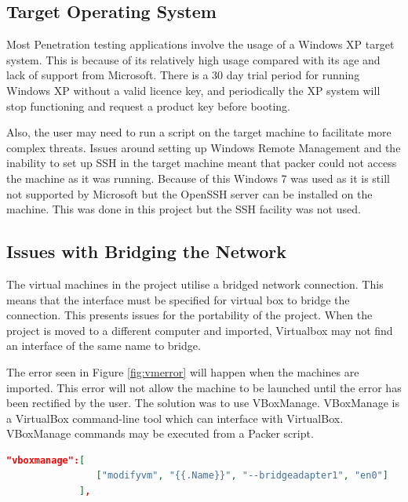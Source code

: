 \subsection{Target Operating System}
Most Penetration testing applications involve the usage of a Windows XP target system. This is because of its relatively high usage compared with its age and lack of support from Microsoft. There is a 30 day trial period for running Windows XP without a valid licence key, and periodically the XP system will stop functioning and request a product key before booting. 

Also, the user may need to run a script on the target machine to facilitate more complex threats. Issues around setting up Windows Remote Management and the inability to set up SSH in the target machine meant that packer could not access the machine as it was running. Because of this Windows 7 was used as it is still not supported by Microsoft but the OpenSSH server can be installed on the machine. This was done in this project but the SSH facility was not used.

\subsection{Issues with Bridging the Network}
The virtual machines in the project utilise a bridged network connection. This means that the interface must be specified for virtual box to bridge the connection. This presents issues for the portability of the project. When the project is moved to a different computer and imported, Virtualbox may not find an interface of the same name to bridge.

The error seen in Figure \ref{fig:vmerror} will happen when the machines are imported. This error will not allow the machine to be launched until the error has been rectified by the user. The solution was to use VBoxManage. VBoxManage is a VirtualBox command-line tool which can interface with VirtualBox. VBoxManage commands may be executed from a Packer script.

\begin{lstlisting}[language = json, caption = Bridged Connection Solution, label=code:bcn]
"vboxmanage":[
                ["modifyvm", "{{.Name}}", "--bridgeadapter1", "en0"]
             ],
\end{lstlisting}

